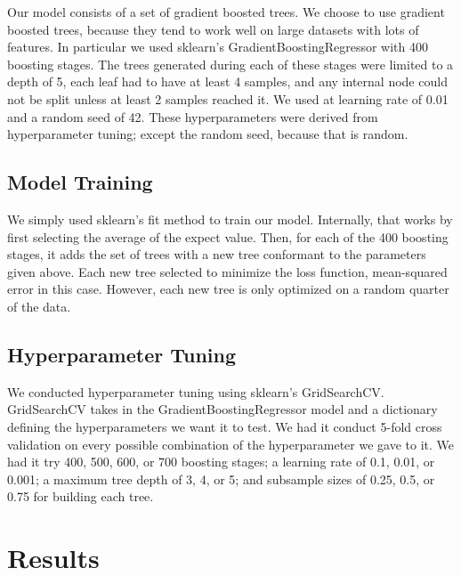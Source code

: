 \documentclass{article}
\begin{document}
Our model consists of a set of gradient boosted trees. We choose to use gradient boosted trees, because they tend to work well on large datasets with lots of features. In particular we used sklearn's GradientBoostingRegressor with 400 boosting stages. The trees generated during each of these stages were limited to a depth of 5, each leaf had to have at least 4 samples, and any internal node could not be split unless at least 2 samples reached it. We used at learning rate of 0.01 and a random seed of 42. These hyperparameters were derived from hyperparameter tuning; except the random seed, because that is random. 

\subsection{Model Training}

We simply used sklearn's fit method to train our model. Internally, that works by first selecting the average of the expect value. Then, for each of the 400 boosting stages, it adds the set of trees with a new tree conformant to the parameters given above. Each new tree selected to minimize the loss function, mean-squared error in this case. However, each new tree is only optimized on a random quarter of the data. 

\subsection{Hyperparameter Tuning}

We conducted hyperparameter tuning using sklearn's GridSearchCV. GridSearchCV takes in the GradientBoostingRegressor model and a dictionary defining the hyperparameters we want it to test. We had it conduct 5-fold cross validation on every possible combination of the hyperparameter we gave to it. We had it try 400, 500, 600, or 700 boosting stages; a learning rate of 0.1, 0.01, or 0.001; a maximum tree depth of 3, 4, or 5; and subsample sizes of 0.25, 0.5, or 0.75 for building each tree. 

\section{Results}
\end{document}
